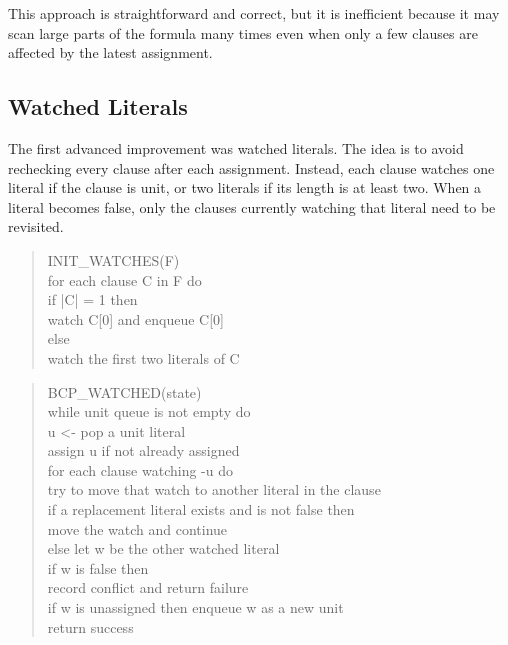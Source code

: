 \documentclass[11pt]{article}
\begin{document}
This approach is straightforward and correct, but it is inefficient because it
may scan large parts of the formula many times even when only a few clauses are
affected by the latest assignment.

\subsection{Watched Literals}

The first advanced improvement was watched literals. The idea is to avoid
rechecking every clause after each assignment. Instead, each clause watches one
literal if the clause is unit, or two literals if its length is at least two.
When a literal becomes false, only the clauses currently watching that literal
need to be revisited.

\begin{quote}
\small
\ttfamily
\raggedright
INIT\_WATCHES(F)\\
\hspace*{1em}for each clause C in F do\\
\hspace*{2em}if |C| = 1 then\\
\hspace*{3em}watch C[0] and enqueue C[0]\\
\hspace*{2em}else\\
\hspace*{3em}watch the first two literals of C
\end{quote}

\begin{quote}
\small
\ttfamily
\raggedright
BCP\_WATCHED(state)\\
\hspace*{1em}while unit queue is not empty do\\
\hspace*{2em}u <- pop a unit literal\\
\hspace*{2em}assign u if not already assigned\\
\hspace*{2em}for each clause watching -u do\\
\hspace*{3em}try to move that watch to another literal in the clause\\
\hspace*{3em}if a replacement literal exists and is not false then\\
\hspace*{4em}move the watch and continue\\
\hspace*{3em}else let w be the other watched literal\\
\hspace*{3em}if w is false then\\
\hspace*{4em}record conflict and return failure\\
\hspace*{3em}if w is unassigned then enqueue w as a new unit\\
\hspace*{1em}return success
\end{quote}
\end{document}
